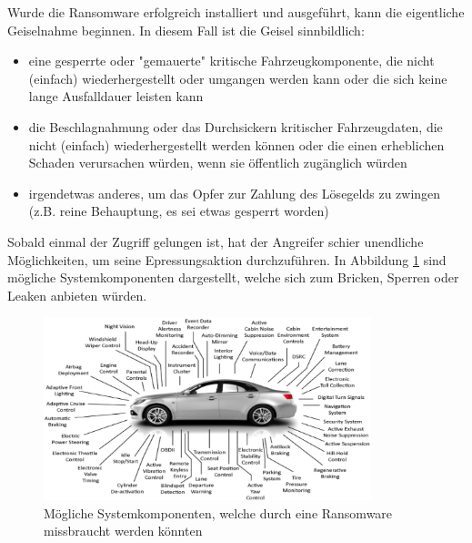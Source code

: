 Wurde die Ransomware erfolgreich installiert und ausgeführt, kann die 
eigentliche Geiselnahme beginnen. In diesem Fall ist die Geisel sinnbildlich:

\begin{itemize}
    \item eine gesperrte oder "gemauerte" kritische Fahrzeugkomponente, die nicht 
    (einfach) wiederhergestellt oder umgangen werden kann oder die sich keine lange 
    Ausfalldauer leisten kann
    \item die Beschlagnahmung oder das Durchsickern kritischer Fahrzeugdaten, die nicht 
    (einfach) wiederhergestellt werden können oder die einen erheblichen Schaden 
    verursachen würden, wenn sie öffentlich zugänglich würden
    \item irgendetwas anderes, um das Opfer zur Zahlung des Lösegelds zu zwingen 
    (z.B. reine Behauptung, es sei etwas gesperrt worden)
\end{itemize}

Sobald einmal der Zugriff gelungen ist, hat der Angreifer schier unendliche 
Möglichkeiten, um seine Epressungsaktion durchzuführen. In Abbildung \ref{fig:Erpressung} sind 
mögliche Systemkomponenten dargestellt, welche sich zum Bricken, Sperren oder 
Leaken anbieten würden.
\newline

\begin{figure}[htbp!]
    \centering
    \includegraphics[width=0.85\textwidth]{Images/Diagnostic-Scanning-1.jpg}
    \caption{Mögliche Systemkomponenten, welche durch eine Ransomware missbraucht werden könnten
    \cite{SnapEDABlog.2014}}
    \label{fig:Erpressung}
\end{figure}

